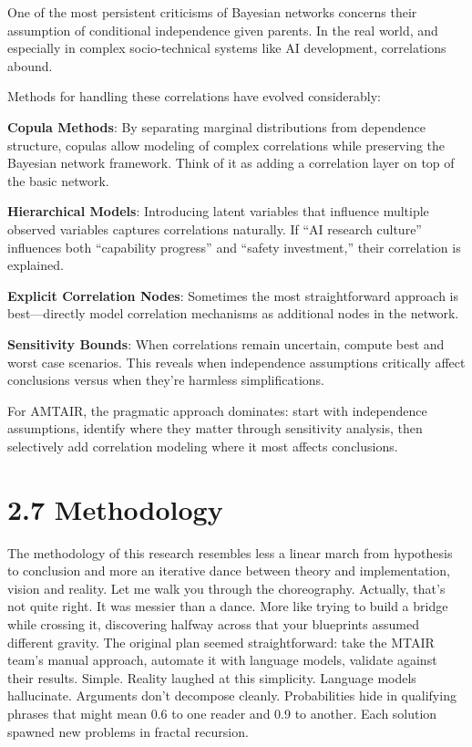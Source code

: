\documentclass[
  11pt,
  letterpaper,
  openany]{book}
\begin{document}
One of the most persistent criticisms of Bayesian networks concerns
their assumption of conditional independence given parents. In the real
world, and especially in complex socio-technical systems like AI
development, correlations abound.

Methods for handling these correlations have evolved considerably:

\textbf{Copula Methods}: By separating marginal distributions from
dependence structure, copulas \textcite{nelson2006} allow modeling of
complex correlations while preserving the Bayesian network framework.
Think of it as adding a correlation layer on top of the basic network.

\textbf{Hierarchical Models}: Introducing latent variables that
influence multiple observed variables captures correlations naturally.
If ``AI research culture'' influences both ``capability progress'' and
``safety investment,'' their correlation is explained.

\textbf{Explicit Correlation Nodes}: Sometimes the most straightforward
approach is best---directly model correlation mechanisms as additional
nodes in the network.

\textbf{Sensitivity Bounds}: When correlations remain uncertain, compute
best and worst case scenarios. This reveals when independence
assumptions critically affect conclusions versus when they're harmless
simplifications.

For AMTAIR, the pragmatic approach dominates: start with independence
assumptions, identify where they matter through sensitivity analysis,
then selectively add correlation modeling where it most affects
conclusions.

\section{2.7 Methodology}\label{sec-methodology}

The methodology of this research resembles less a linear march from
hypothesis to conclusion and more an iterative dance between theory and
implementation, vision and reality. Let me walk you through the
choreography. Actually, that's not quite right. It was messier than a
dance. More like trying to build a bridge while crossing it, discovering
halfway across that your blueprints assumed different gravity. The
original plan seemed straightforward: take the MTAIR team's manual
approach, automate it with language models, validate against their
results. Simple. Reality laughed at this simplicity. Language models
hallucinate. Arguments don't decompose cleanly. Probabilities hide in
qualifying phrases that might mean 0.6 to one reader and 0.9 to another.
Each solution spawned new problems in fractal recursion.
\end{document}
